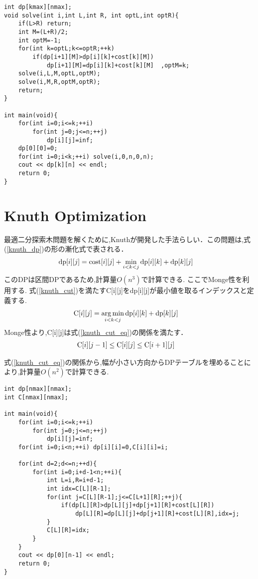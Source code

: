 \documentclass[fleqn]{jarticle}
\DeclareMathOperator*{\argmin}{arg\,min}
\begin{document}
\begin{lstlisting}[caption=Divide and Conquer,label=divide_code]
int dp[kmax][nmax];
void solve(int i,int L,int R, int optL,int optR){
	if(L>R) return;
	int M=(L+R)/2;
	int optM=-1;
	for(int k=optL;k<=optR;++k)
		if(dp[i+1][M]>dp[i][k]+cost[k][M])
			dp[i+1][M]=dp[i][k]+cost[k][M]	,optM=k;
	solve(i,L,M,optL,optM);
	solve(i,M,R,optM,optR);
	return;
}

int main(void){
	for(int i=0;i<=k;++i)
		for(int j=0;j<=n;++j)
			dp[i][j]=inf;
	dp[0][0]=0;
	for(int i=0;i<k;++i) solve(i,0,n,0,n);
	cout << dp[k][n] << endl;
	return 0;
}
\end{lstlisting}

\section{Knuth Optimization}
最適二分探索木問題を解くために,Knuthが開発した手法らしい．この問題は,式(\ref{knuth_dp})の形の漸化式で表される．
\begin{align}
&{\rm dp}[i][j] = {\rm cost}[i][j] + \min_{i<k<j}{{\rm dp}[i][k]+{\rm dp}[k][j]} \label{knuth_dp}
\end{align}
このDPは区間DPであるため,計算量$O(n^3)$で計算できる. ここでMonge性を利用する. 
式(\ref{knuth_cut})を満たすC[i][j]をdp[i][j]が最小値を取るインデックスと定義する. 
\begin{align}
&{\rm C}[i][j] =\argmin_{i<k<j}{{\rm dp}[i][k]+{\rm dp}[k][j]} \label{knuth_cut}
\end{align}
Monge性より,C[i][j]は式(\ref{knuth_cut_eq})の関係を満たす．
\begin{align}
&{\rm C}[i][j-1] \le {\rm C}[i][j] \le {\rm C}[i+1][j]  \label{knuth_cut_eq}
\end{align}

式(\ref{knuth_cut_eq})の関係から,幅が小さい方向からDPテーブルを埋めることにより,計算量$O(n^2)$で計算できる.  \\

\begin{lstlisting}[caption=Divide and Conquer,label=divide_code]
int dp[nmax][nmax];
int C[nmax][nmax];

int main(void){
	for(int i=0;i<=k;++i)
		for(int j=0;j<=n;++j)
			dp[i][j]=inf;
	for(int i=0;i<n;++i) dp[i][i]=0,C[i][i]=i;
	
	for(int d=2;d<=n;++d){
		for(int i=0;i+d-1<n;++i){
			int L=i,R=i+d-1;
			int idx=C[L][R-1];
			for(int j=C[L][R-1];j<=C[L+1][R];++j){
				if(dp[L][R]>dp[L][j]+dp[j+1][R]+cost[L][R])
					dp[L][R]=dp[L][j]+dp[j+1][R]+cost[L][R],idx=j;	
			}
			C[L][R]=idx;
		}
	}
	cout << dp[0][n-1] << endl;
	return 0;
}
\end{lstlisting}
\end{document}
